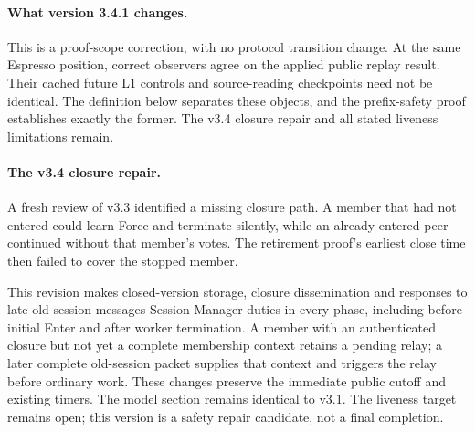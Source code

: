 \documentclass[11pt,a4paper]{article}
\newcounter{protocol}
\begin{document}
\paragraph{What version 3.4.1 changes.}
This is a proof-scope correction, with no protocol transition change.
At the same Espresso position, correct observers agree on the applied
public replay result. Their cached future L1 controls and source-reading
checkpoints need not be identical. The definition below separates these
objects, and the prefix-safety proof establishes exactly the former.
The v3.4 closure repair and all stated liveness limitations remain.

\paragraph{The v3.4 closure repair.}
A fresh review of v3.3 identified a missing closure path. A member that
had not entered could learn Force and terminate silently, while an
already-entered peer continued without that member's votes. The retirement
proof's earliest close time then failed to cover the stopped member.

This revision makes closed-version storage, closure dissemination and
responses to late old-session messages Session Manager duties in every
phase, including before initial Enter and after worker termination.
A member with an authenticated closure but not yet a complete membership
context retains a pending relay; a later complete old-session packet
supplies that context and triggers the relay before ordinary work.
These changes preserve the immediate public cutoff and existing timers.
The model section remains identical to v3.1. The liveness target remains
open; this version is a safety repair candidate, not a final completion.
\end{document}
